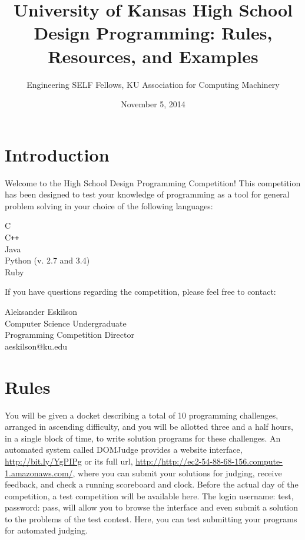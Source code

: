 \documentclass[a4paper]{article}
\title{University of Kansas High School Design Programming: Rules, Resources, and Examples}
\date{November 5, 2014}
\author{Engineering SELF Fellows, KU Association for Computing Machinery}
\begin{document}
\lstset{
    language=java,
    basicstyle=\ttfamily,
    numbers=left,
    numbersep=8pt,
    showspaces=false,
    showstringspaces=false
}
\maketitle

\tableofcontents

\newpage

\section{Introduction}

Welcome to the High School Design Programming Competition! This competition has been designed to test your knowledge of programming as a tool for general problem solving in your choice of the following languages:
\begin{center}
    C \\
    C\texttt{++} \\
    Java \\ 
    Python (v. 2.7 and 3.4) \\
    Ruby \\
\end{center}

If you have questions regarding the competition, please feel free to contact:
\begin{center}
    Aleksander Eskilson \\
    Computer Science Undergraduate \\
    Programming Competition Director \\
    aeskilson@ku.edu \\
\end{center}

\newpage

\section{Rules}

You will be given a docket describing a total of 10 programming challenges, arranged in ascending difficulty, and you will be allotted three and a half hours, in a single block of time, to write solution programs for these challenges. An automated system called DOMJudge provides a website interface, \url{http://bit.ly/YgPIPg} or its full url, \url{http://http://ec2-54-88-68-156.compute-1.amazonaws.com/}, where you can submit your solutions for judging, receive feedback, and check a running scoreboard and clock. Before the actual day of the competition, a test competition will be available here. The login username: test, password: pass, will allow you to browse the interface and even submit a solution to the problems of the test contest. Here, you can test submitting your programs for automated judging. 
\end{document}
